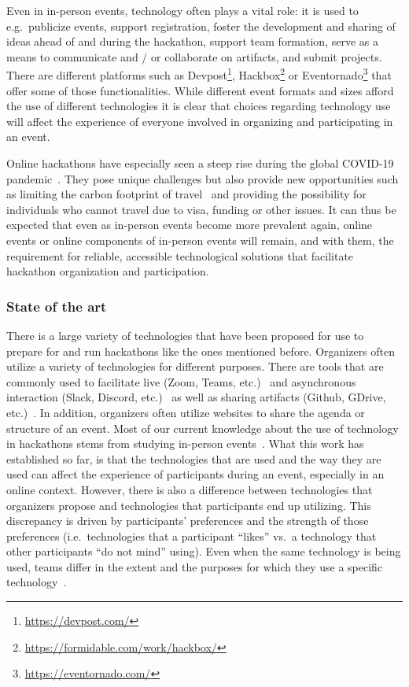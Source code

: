 \documentclass{ieeeaccess}
\begin{document}
Even in in-person events, technology often plays a vital role: it is used to e.g.~publicize events, support registration, foster the development and sharing of ideas ahead of and during the hackathon, support team formation, serve as a means to communicate and / or collaborate on artifacts, and submit projects. 
There are different platforms such as Devpost\footnote{\href{https://devpost.com/}{https://devpost.com/}}, Hackbox\footnote{\href{https://formidable.com/work/hackbox/}{https://formidable.com/work/hackbox/}} or Eventornado\footnote{\href{https://eventornado.com/}{https://eventornado.com/}} that offer some of those functionalities. 
While different event formats and sizes afford the use of different technologies it is clear that choices regarding technology use will affect the experience of everyone involved in organizing and participating in an event.

Online hackathons have especially seen a steep rise during the global COVID-19 pandemic~\cite{bertello2022open,temiz2020open}. 
They pose unique challenges but also provide new opportunities such as limiting the carbon footprint of travel~\cite{burtscher2020} and providing the possibility for individuals who cannot travel due to visa, funding or other issues. 
It can thus be expected that even as in-person events become more prevalent again, online events or online components of in-person events will remain, and with them, the requirement for reliable, accessible technological solutions that facilitate hackathon organization and participation.

\subsubsection{State of the art}
There is a large variety of technologies that have been proposed for use to prepare for and run hackathons like the ones mentioned before. 
Organizers often utilize a variety of technologies for different purposes. 
There are tools that are commonly used to facilitate live (Zoom, Teams, etc.)~\cite{braune2021interdisciplinary} and asynchronous interaction (Slack, Discord, etc.)~\cite{bertello2022open,fowler2020jamming} as well as sharing artifacts (Github, GDrive, etc.)~\cite{mcintosh2021hackathon,mahmoud2022one}. 
In addition, organizers often utilize websites to share the agenda or structure of an event. 
Most of our current knowledge about the use of technology in hackathons stems from studying in-person events~\cite{falk202010,taylor2018everybody,trainer2016hackathon}. 
What this work has established so far, is that the technologies that are used and the way they are used can affect the experience of participants during an event, especially in an online context. 
However, there is also a difference between technologies that organizers propose and technologies that participants end up utilizing. 
This discrepancy is driven by participants' preferences and the strength of those preferences (i.e.~technologies that a participant ``likes'' vs.~a technology that other participants ``do not mind'' using). 
Even when the same technology is being used, teams differ in the extent and the purposes for which they use a specific technology~\cite{mendes2022socio}.
\end{document}
